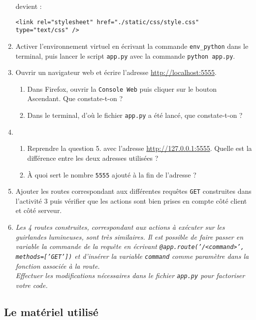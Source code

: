 \documentclass[a4paper]{article}
\begin{document}
\begin{enumerate}
    devient : 

	\begin{verbatim}
<link rel="stylesheet" href="./static/css/style.css" type="text/css" />
    \end{verbatim}
  \item Activer l'environnement virtuel en écrivant la commande \verb|env_python| dans le terminal, puis lancer le script \verb|app.py| avec la commande \verb|python app.py|.
  \item Ouvrir un navigateur web et écrire l'adresse \url{http://localhost:5555}. 
    \begin{enumerate}
      \item Dans Firefox, ouvrir la \verb|Console Web| puis cliquer sur le bouton \og{}Ascendant\fg. Que constate-t-on ?
      \item Dans le terminal, d'où le fichier \verb|app.py| a été lancé, que constate-t-on ?
    \end{enumerate}
  \item

    \begin{enumerate}
      \item Reprendre la question 5. avec l'adresse \url{http://127.0.0.1:5555}.  Quelle est la différence entre les deux adresses utilisées ? 
      \item À quoi sert le nombre \verb|5555| ajouté à la fin de l'adresse ? 
    \end{enumerate}
  \item Ajouter les routes correspondant aux différentes requêtes \verb|GET| construites dans l'activité 3 puis vérifier que les actions sont bien prises en compte côté client et côté serveur.
  \item {\itshape Les 4 routes construites, correspondant aux actions à exécuter sur les guirlandes lumineuses, sont très similaires. Il est possible de faire passer en variable la commande de la requête en écrivant \texttt{@app.route('/<command>', methods=['GET'])} et d'insérer la variable \texttt{command} comme paramètre dans la fonction associée à la route.\\ Effectuer les modifications nécessaires dans le fichier \verb|app.py| pour \og factoriser \fg{} votre code.}
\end{enumerate}

\pagebreak

\subsection{Le matériel utilisé}
\end{document}

